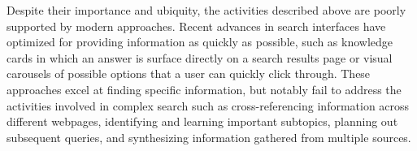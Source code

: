 

Despite their importance and ubiquity, the activities described above are poorly supported by modern approaches. Recent advances in search interfaces have optimized for providing information as quickly as possible, such as knowledge cards in which an answer is surface directly on a search results page or visual carousels of possible options that a user can quickly click through. These approaches excel at finding specific information, but notably fail to address the activities involved in complex search such as cross-referencing information across different webpages, identifying and learning important subtopics, planning out subsequent queries, and synthesizing information gathered from multiple sources.

